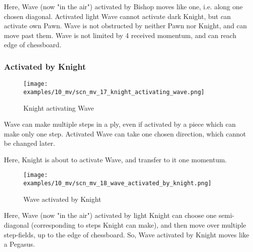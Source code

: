 Here, Wave (now "in the air") activated by Bishop moves like one, i.e. along one chosen
diagonal. Activated light Wave cannot activate dark Knight, but can activate own Pawn.
Wave is not obstructed by neither Pawn nor Knight, and can move past them. Wave is not
limited by 4 received momentum, and can reach edge of chessboard.

\clearpage %

\subsubsection*{Activated by Knight}
\label{sec:Miranda's veil/Wave/Movement/Activated by Knight}

\vspace*{-1.4\baselineskip}
\noindent
\begin{figure}[h]
\texttt{[image: examples/10\_mv/scn\_mv\_17\_knight\_activating\_wave.png]}
\caption{Knight activating Wave}
\label{fig:scn_mv_17_knight_activating_wave}
\end{figure}

Wave can make multiple steps in a ply, even if activated by a piece which can make only
one step. Activated Wave can take one chosen direction, which cannot be changed later.

Here, Knight is about to activate Wave, and transfer to it one momentum.

\clearpage %

\vspace*{-2.1\baselineskip}
\noindent
\begin{figure}[!h]
\texttt{[image: examples/10\_mv/scn\_mv\_18\_wave\_activated\_by\_knight.png]}
\caption{Wave activated by Knight}
\label{fig:scn_mv_18_wave_activated_by_knight}
\end{figure}

Here, Wave (now "in the air") activated by light Knight can choose one semi-diagonal
(corresponding to steps Knight can make), and then move over multiple step-fields, up
to the edge of chessboard. So, Wave activated by Knight moves like a Pegasus.

\clearpage %

